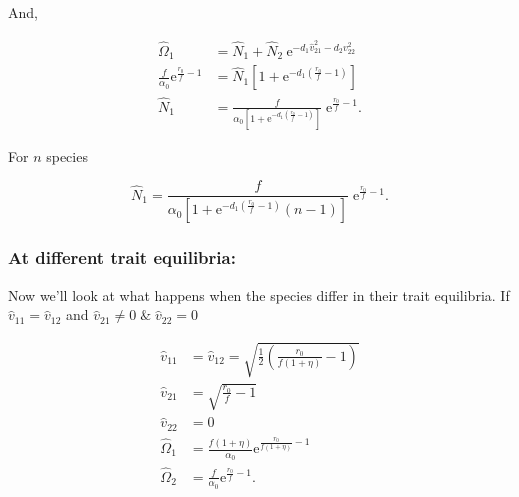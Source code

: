 \noindent And,

\begin{equation} \label{eq:two-traits-v1-nonzero-v2-zero-N}
\begin{split}
    \hat\Omega_1 &= \hat{N}_1 + \hat{N}_2 \: \text{e}^{-d_1 \hat{v}_{21}^2 -
        d_2 v_{22}^2} \\
    \frac{f}{\alpha_0} \textrm{e}^{\frac{r_0}{f} - 1} &= \hat{N}_1 \left[
        1 + \text{e}^{- d_1 \left( \frac{ r_0 }{ f } - 1 \right) } \right] \\
    \hat{N}_1 &= \frac{ f }{ \alpha_0 \left[ 1 + \text{e}^{- d_1 \left(
        \frac{ r_0 }{ f } - 1 \right) } \right] } \; \text{e}^{\frac{r_0}{f} - 1}
    \text{.}
\end{split}
\end{equation}


For $n$ species

\begin{equation} \label{eq:two-traits-v1-nonzero-v2-zero-N-n-species}
    \hat{N}_1 = \frac{ f }{ \alpha_0 \left[ 1 + \text{e}^{- d_1 \left(
        \frac{ r_0 }{ f } - 1 \right) } (n - 1) \right] } \; \text{e}^{\frac{r_0}{f} - 1}
    \text{.}
\end{equation}






\subsubsection*{At different trait equilibria:}




Now we'll look at what happens when the species differ in their trait equilibria.
If $\hat{v}_{11} = \hat{v}_{12}$ and $\hat{v}_{21} \ne 0 \; \& \; \hat{v}_{22} = 0$

\begin{equation*}
\begin{split}
    \hat{v}_{11} &= \hat{v}_{12} = \sqrt{\frac{1}{2}
        \left( \frac{r_0}{f (1 + \eta)} - 1 \right)} \\
    \hat{v}_{21} &= \sqrt{ \frac{ r_0 }{ f } - 1 } \\
    \hat{v}_{22} &= 0 \\
    \hat\Omega_1 &= \frac{f (1 + \eta)}{\alpha_0}
        \text{e}^{\frac{r_0}{f (1 + \eta)} - 1} \\
    \hat\Omega_2 &= \frac{f}{\alpha_0} \textrm{e}^{\frac{r_0}{f} - 1}
    \text{.}
\end{split}
\end{equation*}

